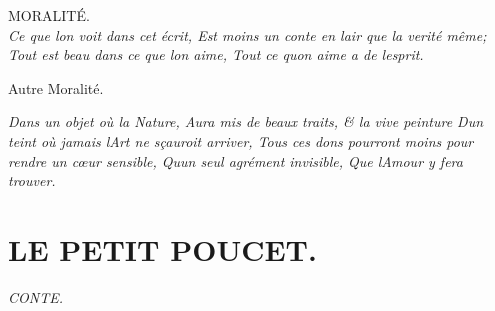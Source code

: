 \documentclass[14pt,a4paper]{memoir}
\begin{document}
\begin{otherlanguage}{french}
MORALITÉ. \\

\emph{{Ce que l\textquotesingle on voit dans cet écrit,} {Est moins un
conte en l\textquotesingle air que la verité même; } {Tout est beau dans
ce que l\textquotesingle on aime,} {Tout ce qu\textquotesingle on aime a
de l\textquotesingle esprit.}}

Autre Moralité.

\emph{{Dans un objet où la Nature,} {Aura mis de beaux traits, \& la
vive peinture } {D\textquotesingle un teint où jamais
l\textquotesingle Art ne sçauroit arriver, } {Tous ces dons pourront
moins pour rendre un cœur sensible,} {Qu\textquotesingle un seul
agrément invisible,} {Que l\textquotesingle Amour y fera trouver.}}

\section{LE PETIT POUCET.}

\emph{CONTE.}


\end{otherlanguage}
\end{document}
